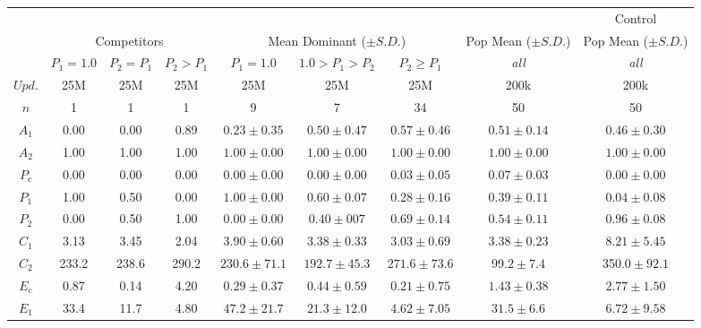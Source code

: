 \begin{figure*}%

\begin{center}
\setlength\tabcolsep{1.5pt} %
\begin{tabular}{ | c || c c c | c c c | c | c | }
  \multicolumn{8}{c}{} & \multicolumn{1}{c}{Control} \\
  \multicolumn{1}{c}{} & \multicolumn{3}{c}{Competitors} & \multicolumn{3}{c}{Mean Dominant ($\pm S.D.$)} & \multicolumn{1}{c}{ Pop Mean ($\pm S.D.$)} & \multicolumn{1}{c}{ Pop Mean ($\pm S.D.$)} \\
 \cline{2-9}
  \multicolumn{1}{c|}{} & \tiny{$P_{1} = 1.0$} & \tiny{$P_{2} = P_{1}$} & \tiny{$P_{2} > P_{1}$} & \tiny{$P_{1} = 1.0$} & \tiny{$1.0 > P_{1} > P_{2}$} & \tiny{$P_{2} \geq P_{1}$} & \tiny{\textit{all}} & \tiny{\textit{all}}  \\
 \hline
 $Upd.$ & 25M & 25M & 25M & 25M & 25M & 25M & 200k & 200k \\
 $n$ & 1 & 1 & 1 & 9 & 7 & 34 & 50 & 50 \\
 \hhline{|=||===|===|=|=|}
 $A_1$ & 0.00 & 0.00 & 0.89 & $0.23 \pm 0.35$ & $0.50 \pm 0.47$ & $0.57 \pm 0.46$ & $0.51 \pm 0.14$ & $0.46 \pm 0.30$\\
 $A_2$ & 1.00 & 1.00 & 1.00 & $1.00 \pm  0.00$ & $1.00 \pm 0.00$ & $1.00 \pm 0.00$ & $1.00 \pm 0.00$ & $1.00 \pm 0.00$ \\
 \hline
 $P_{c}$ & 0.00 & 0.00 & 0.00 & $0.00 \pm 0.00$ & $0.00 \pm 0.00$ & $0.03 \pm 0.05$ & $0.07 \pm 0.03$ & $0.00 \pm 0.00$ \\
 $P_1$ & 1.00 & 0.50 & 0.00 & $1.00 \pm 0.00$ & $0.60 \pm 0.07$ & $0.28 \pm 0.16$ & $0.39 \pm 0.11$ & $0.04 \pm 0.08$ \\
 $P_2$ & 0.00 & 0.50 & 1.00 & $0.00 \pm 0.00$ & $0.40 \pm 007$ & $0.69 \pm 0.14$ & $0.54 \pm 0.11$ & $0.96 \pm 0.08$ \\
 \hline
 $C_1$ & 3.13 & 3.45 & 2.04 & $3.90 \pm 0.60$ & $3.38 \pm 0.33$ & $3.03 \pm 0.69$ & $3.38 \pm 0.23$ & $8.21 \pm 5.45$ \\
 $C_2$ & 233.2 & 238.6 & 290.2 & $230.6 \pm 71.1$ & $192.7 \pm 45.3$ & $271.6 \pm 73.6 $ & 99$.2 \pm 7.4 $& 350$.0 \pm 92.1 $ \\
 \hline
 $E_{c}$ & 0.87 & 0.14 & 4.20 & $0.29 \pm 0.37$ & $0.44 \pm 0.59$ & $0.21 \pm 0.75$ & $1.43 \pm 0.38$ & $2.77 \pm 1.50$ \\
 $E_1$ & 33.4 & 11.7 & 4.80 & $47.2 \pm 21.7$ & $21.3 \pm 12.0$ & $4.62 \pm 7.05$ & $31.5 \pm 6.6$ & $6.72 \pm 9.58$ \\

\end{tabular}
\end{center}
\end{figure*}
